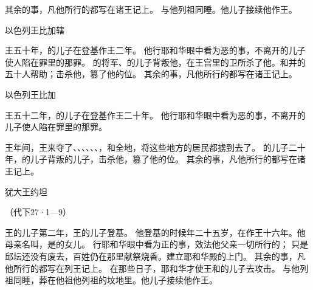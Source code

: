 {其余的事，凡他所行的都写在{}诸王记上。
与他列祖同睡。他儿子{}接续他作王。
\par }{\SH 以色列王比加辖
\par }{\PP {}王{}五十年，{}的儿子{}在{}登基作{}王二年。
他行耶和华眼中看为恶的事，不离开{}的儿子{}使{}人陷在罪里的那罪。
的将军、{}的儿子{}背叛他，在{}王宫里的卫所杀了他。{}和{}并{}的五十人帮助{}；{}击杀他，篡了他的位。
其余的事，凡他所行的都写在{}诸王记上。
\par }{\SH 以色列王比加
\par }{\PP {}王{}五十二年，{}的儿子{}在{}登基作{}王二十年。
他行耶和华眼中看为恶的事，不离开{}的儿子{}使{}人陷在罪里的那罪。
\par }{\PP {}王{}年间，{}王{}来夺了{}、{}、{}、{}、{}、{}、{}，和{}全地，将这些地方的居民都掳到{}去了。
的儿子{}二十年，{}的儿子{}背叛{}的儿子{}，击杀他，篡了他的位。
其余的事，凡他所行的都写在{}诸王记上。
\par }{\SH 犹大王约坦
\par }{\R （代下27·1—9）
\par }{\PP {}王{}的儿子{}第二年，{}王{}的儿子{}登基。
他登基的时候年二十五岁，在{}作王十六年。他母亲名叫{}，是{}的女儿。
行耶和华眼中看为正的事，效法他父亲{}一切所行的；
只是邱坛还没有废去，百姓仍在那里献祭烧香。{}建立耶和华殿的上门。
其余的事，凡他所行的都写在{}列王记上。
在那些日子，耶和华才使{}王{}和{}的儿子{}去攻击{}。
与他列祖同睡，葬在他祖{}他列祖的坟地里。他儿子{}接续他作王。

}
